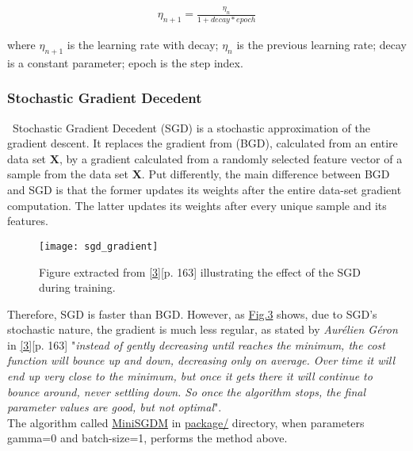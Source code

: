 \begin{align*}
\eta_{n+1} = \frac{\eta_n}{1 + decay * epoch}
\end{align*}

\noindent where $\eta_{n+1}$ is the learning rate with decay; $\eta_n$ is the previous learning rate; decay is a constant parameter; epoch is the step index.

\subsubsection{Stochastic Gradient Decedent}
\label{chap:Stochastic Gradient Decedent}

\quad \, Stochastic Gradient Decedent (SGD) is a stochastic approximation of the gradient descent. It replaces the gradient from (BGD), calculated from an entire data set $\boldsymbol{X}$, by a gradient calculated from a randomly selected feature vector of a sample from the data set $\boldsymbol{X}$. Put differently, the main difference between BGD and SGD is that the former updates its weights after the entire data-set gradient computation. The latter updates its weights after every unique sample and its features.

\begin{figure}[H]
\label{fig:fig3}
\centering
\texttt{[image: sgd\_gradient]}
\caption{Figure extracted from \hyperref[Bib:Hands-on Machine Learning]{[3]}[p. 163] illustrating the effect of the SGD during training.}
\end{figure}

Therefore, SGD is faster than BGD. However, as \hyperref[fig:fig3]{Fig.3} shows, due to SGD's stochastic nature, the gradient is much less regular, as stated by \textit{Aurélien Géron} in \hyperref[Bib:Hands-on Machine Learning]{[3]}[p. 163] "\textit{instead of gently decreasing until reaches the minimum, the cost function will bounce up and down, decreasing only on average. Over time it will end up very close to the minimum, but once it gets there it will continue to bounce around, never settling down. So once the algorithm stops, the final parameter values are good, but not optimal}".\\

The algorithm called \href{https://github.com/fabiorodp/UiO-FYS-STK4155/blob/master/Project2/package/gradient_descent.py}{MiniSGDM} in \href{https://github.com/fabiorodp/UiO-FYS-STK4155/blob/master/Project2/package/}{package/} directory, when parameters gamma=0 and batch-size=1, performs the method above.

